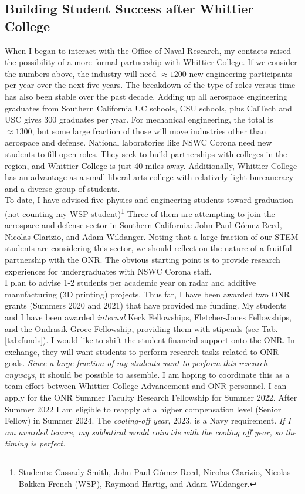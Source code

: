 \documentclass[../../../main.tex]{subfiles}
\begin{document}
\subsection{Building Student Success after Whittier College}

When I began to interact with the Office of Naval Research, my contacts raised the possibility of a more formal partnership with Whittier College.  If we consider the numbers above, the industry will need $\approx 1200$ new engineering participants per year over the next five years.  The breakdown of the type of roles versus time has also been stable over the past decade.  Adding up all aerospace engineering graduates from Southern California UC schools, CSU schools, plus CalTech and USC gives 300 graduates per year.  For mechanical engineering, the total is $\approx 1300$, but some large fraction of those will move industries other than aerospace and defense.  National laboratories like NSWC Corona need new students to fill open roles.  They seek to build partnerships with colleges in the region, and Whittier College is just 40 miles away.  Additionally, Whittier College has an advantage as a small liberal arts college with relatively light bureaucracy and a diverse group of students.
\\
\vspace{0.25cm}
To date, I have advised five physics and engineering students toward graduation (not counting my WSP student)\footnote{Students: Cassady Smith, John Paul G\'{o}mez-Reed, Nicolas Clarizio, Nicolas Bakken-French (WSP), Raymond Hartig, and Adam Wildanger.}  Three of them are attempting to join the aerospace and defense sector in Southern California: John Paul G\'{o}mez-Reed, Nicolas Clarizio, and Adam Wildanger.  Noting that a large fraction of our STEM students are considering this sector, we should reflect on the nature of a fruitful partnership with the ONR.  The obvious starting point is to provide research experiences for undergraduates with NSWC Corona staff.  
\\
\vspace{0.25cm}
I plan to advise 1-2 students per academic year on radar and additive manufacturing (3D printing) projects.  Thus far, I have been awarded two ONR grants (Summers 2020 and 2021) that have provided me funding.  My students and I have been awarded \textit{internal} Keck Fellowships, Fletcher-Jones Fellowships, and the Ondrasik-Groce Fellowship, providing them with stipends (see Tab. \ref{tab:funds}).  I would like to shift the student financial support onto the ONR.  In exchange, they will want students to perform research tasks related to ONR goals.  \textit{Since a large fraction of my students want to perform this research anyways,} it should be possible to assemble.  I am hoping to coordinate this as a team effort between Whittier College Advancement and ONR personnel.  I can apply for the ONR Summer Faculty Research Fellowship for Summer 2022.  After Summer 2022 I am eligible to reapply at a higher compensation level (Senior Fellow) in Summer 2024.  The \textit{cooling-off year}, 2023, is a Navy requirement.  \textit{If I am awarded tenure, my sabbatical would coincide with the cooling off year, so the timing is perfect.}
\end{document}
